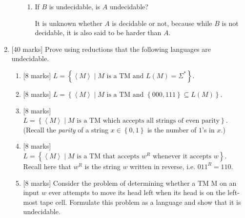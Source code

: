 \documentclass{article}
\newcommand{\set}[1]{{\left\{#1\right\}}}    %
\newcommand{\enc}[1]{\left<#1\right>}
\begin{document}
\begin{enumerate}
\begin{enumerate}
\begin{enumerate}
                    \item If $B$ is undecidable, is $A$ undecidable?

                            It is unknown whether $A$ is decidable or not, because while $B$ is not decidable, it is also said to be harder than $A$.
                \end{enumerate}

        \end{enumerate}
    \item {[40 marks]} Prove using reductions that the following languages are undecidable.

    \begin{enumerate}
    \item {[8 marks]} $L=\set{\enc{M}\mid M\text{ is a TM and }L(M)=\Sigma^*}$.
            \item {[8 marks]} $L=\set{\enc{M}\mid M\text{ is a TM and }\set{000,111}\subseteq L(M)}$.
            \item {[8 marks]} $L=\set{\enc{M}\mid M\text{ is a TM which accepts all strings of even parity}}$. (Recall the \emph{parity} of a string $x\in\set{0,1}$ is the number of $1$'s in $x$.)
        \item {[8 marks]} $L=\set{\enc{M}\mid M\text{ is a TM that accepts }w^R\text{ whenever it accepts }w}$. Recall here that $w^R$ is the string $w$ written in reverse, i.e. $011^R=110$.
        \item {[8 marks]} Consider the problem of determining whether a TM M on an input $w$ ever attempts to move its head left when its head is on the left-most tape cell. Formulate this problem as a language and show that it is undecidable.
    \end{enumerate}
 \end{enumerate}
\end{document}
